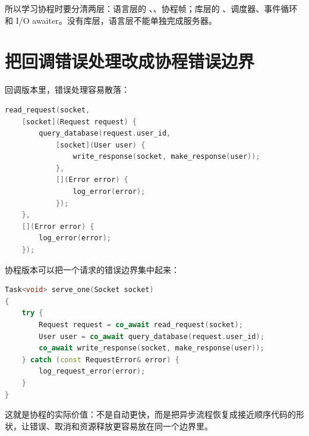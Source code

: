 所以学习协程时要分清两层：语言层的 、、协程帧；库层的 、调度器、事件循环和 I/O awaiter。没有库层，语言层不能单独完成服务器。

\section{把回调错误处理改成协程错误边界}

回调版本里，错误处理容易散落：

\begin{lstlisting}[language=C++,caption={回调错误散落}]
read_request(socket,
    [socket](Request request) {
        query_database(request.user_id,
            [socket](User user) {
                write_response(socket, make_response(user));
            },
            [](Error error) {
                log_error(error);
            });
    },
    [](Error error) {
        log_error(error);
    });
\end{lstlisting}

协程版本可以把一个请求的错误边界集中起来：

\begin{lstlisting}[language=C++,caption={协程请求边界}]
Task<void> serve_one(Socket socket)
{
    try {
        Request request = co_await read_request(socket);
        User user = co_await query_database(request.user_id);
        co_await write_response(socket, make_response(user));
    } catch (const RequestError& error) {
        log_request_error(error);
    }
}
\end{lstlisting}

这就是协程的实际价值：不是自动更快，而是把异步流程恢复成接近顺序代码的形状，让错误、取消和资源释放更容易放在同一个边界里。
